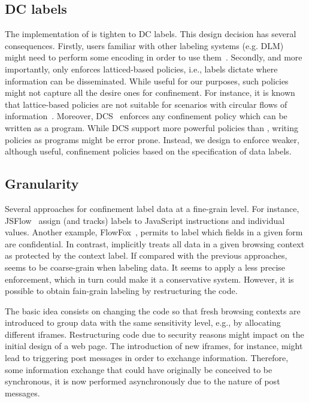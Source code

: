 
\subsection{DC labels}

The implementation of \sys{} is tighten to DC labels. This design decision has
several consequences. Firstly, users familiar with other labeling systems
(e.g. DLM) might need to perform some encoding in order to use
them~\cite{GenLabels}.  Secondly, and more importantly, \sys{} only enforces
latticed-based policies, i.e., labels dictate where information can be
disseminated.  While useful for our purposes, such policies might not capture
all the desire ones for confinement. For instance, it is known that
lattice-based policies are not suitable for scenarios with circular flows of
information~\cite{Badger:1995}. Moreover, DCS~\cite{Akhawe2013} enforces any
confinement policy which can be written as a program. While DCS support more
powerful policies than \sys{}, writing policies as programs might be error
prone. Instead, we design \sys{} to enforce weaker, although useful,
confinement policies based on the specification of data labels. 

\subsection{Granularity} 

Several approaches for confinement label data at a fine-grain level. For
instance, JSFlow~\cite{Hedin:2012}\tocite{} assign (and tracks) labels to
JavaScript instructions and individual values. Another example,
FlowFox~\cite{DeGroef:2012}, permits to label which fields in a given form are
confidential. In contrast, \sys{} implicitly treats all data in a given browsing
context as protected by the context label.  If compared with the previous
approaches, \sys{} seems to be coarse-grain when labeling data.  It seems to
apply a less precise enforcement, which in turn could make it a conservative
system. However, it is possible to obtain fain-grain labeling by restructuring
the code.

The basic idea consists on changing the code so that fresh browsing contexts are
introduced to group data with the same sensitivity level, e.g., by allocating
different iframes.  Restructuring code due to security reasons might impact on
the initial design of a web page. The introduction of new iframes, for instance,
might lead to triggering post messages in order to exchange
information. Therefore, some information exchange that could have 
originally be conceived to be synchronous, it is now performed asynchronously due to the
nature of post messages. 





